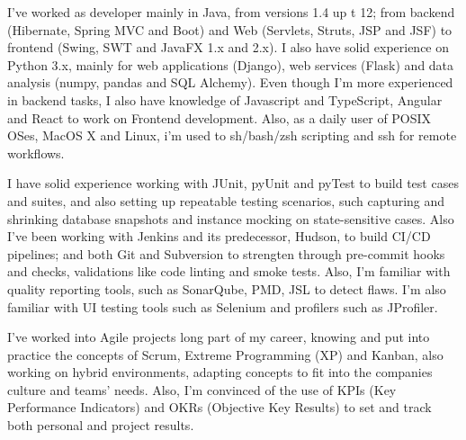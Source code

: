 



\begin{cvparagraph}
	I've worked as developer mainly in Java, from versions 1.4 up t 12; from backend (Hibernate, Spring MVC and Boot) and Web (Servlets, Struts, JSP and JSF) to frontend (Swing, SWT and JavaFX 1.x and 2.x). I also have solid experience on Python 3.x, mainly for web applications (Django), web services (Flask) and data analysis (numpy, pandas and SQL Alchemy). Even though I'm more experienced in backend tasks, I also have knowledge of Javascript and TypeScript, Angular and React to work on Frontend development. Also, as a daily user of POSIX OSes,
	MacOS X and Linux, i'm used to sh/bash/zsh scripting and ssh for remote workflows.
\end{cvparagraph}



\begin{cvparagraph}
	I have solid experience working with JUnit, pyUnit and pyTest to build test cases and suites, and also setting up repeatable testing scenarios, such capturing and shrinking database snapshots and instance mocking on state-sensitive cases. Also I've been working with Jenkins and its predecessor, Hudson, to build CI/CD pipelines; and both Git and Subversion to strengten through pre-commit hooks and checks, validations like code linting and smoke tests. Also, I'm familiar with quality reporting tools, such as SonarQube, PMD, JSL to detect flaws. I'm also familiar with UI testing tools such as Selenium and profilers such as JProfiler.
\end{cvparagraph}


\begin{cvparagraph}
	I've worked into Agile projects long part of my career, knowing and put into practice the concepts of Scrum, Extreme Programming (XP) and Kanban, also working on hybrid environments, adapting concepts to fit into the companies culture and teams' needs. Also, I'm convinced of the use of KPIs (Key Performance Indicators) and OKRs (Objective Key Results) to set and track both personal and project results.
\end{cvparagraph}

